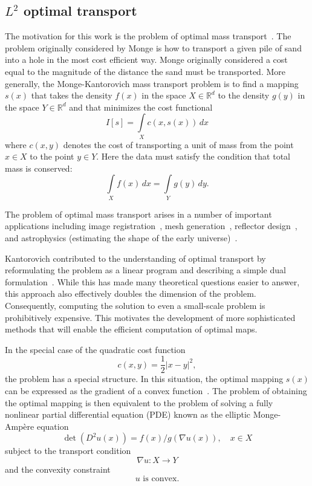\documentclass{amsart}
\theoremstyle{lemma}
\theoremstyle{remark}
\begin{document}
\subsection{$L^2$ optimal transport}\label{sec:optimaltransport}
The motivation for this work is the problem of optimal mass transport~\cite{Ambrosio,EvansSurvey,Villani}.  The problem originally considered by Monge is how to transport a given pile of sand into a hole in the most cost efficient way.  Monge originally considered a cost equal to the magnitude of the distance the sand must be transported.  More generally, the Monge-Kantorovich mass transport problem is to find a mapping $s(x)$ that takes the density $f(x)$ in the space $X\in{\mathbb{R}}^d$ to the density $g(y)$ in the space $Y\in{\mathbb{R}}^d$ and that minimizes the cost functional
\[ I[s] = \int\limits_X c(x,s(x))\,dx \]
where $c(x,y)$ denotes the cost of transporting a unit of mass from the point $x\in X$ to the point $y\in Y$.  Here the data must satisfy the condition that total mass is conserved:
\[ \int\limits_X f(x)\,dx = \int\limits_Y g(y)\,dy. \]

The problem of optimal mass transport arises in a number of important applications including
image registration~\cite{Haker, HakerRegistration, RehmanRegistration},
 mesh generation~\cite{Delzanno, DelzannoGrid, Budd}, 
 reflector design~\cite{GlimmOlikerReflectorDesign,GlimmOliker2Reflectors}, 
 and astrophysics (estimating the shape of the early universe)~\cite{FrischUniv}.  
 
Kantorovich contributed to the understanding of optimal transport by reformulating the problem as a linear program and describing a simple dual formulation~\cite{Kantorovich1,Kantorovich2}.  While this has made many theoretical questions easier to answer, this approach also effectively doubles the dimension of the problem.  Consequently, computing the solution to even a small-scale problem is prohibitively expensive.  This motivates the development of more sophisticated methods that will enable the efficient computation of optimal maps.
 
In the special case of the quadratic cost function
\[ c(x,y) = \frac{1}{2}{\left\vert{x-y}\right\vert}^2, \]
the problem has a special structure.  In this situation, the optimal mapping $s(x)$ can be expressed as the gradient of a convex function~\cite{EvansSurvey,Rockafellar}.  The problem of obtaining the optimal mapping is then equivalent to the problem of solving a fully nonlinear partial differential equation (PDE) known as the elliptic {{Monge-Amp\`ere}\xspace} equation
\begin{equation}
\label{eq:MA}\tag{MA}
\det(D^2u(x)) = f(x)/g(\nabla u(x)), \quad x\in X
\end{equation}
subject to the transport condition
\begin{equation}
\label{eq:bc}\tag{BC}
\nabla u:X\to Y
\end{equation}
and the convexity constraint
\begin{equation}
\label{eq:conv}\tag{C}
u \text{ is convex.}
\end{equation}
\end{document}
